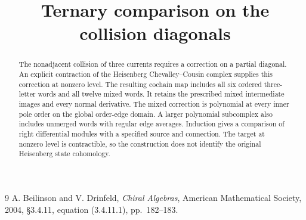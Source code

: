 \documentclass[11pt,oneside]{memoir}
\title{Ternary comparison on the collision diagonals}
\author{}
\date{}
\begin{document}
\maketitle
\begin{abstract}
The nonadjacent collision of three currents requires a correction on a partial diagonal.
An explicit contraction of the Heisenberg Chevalley--Cousin complex supplies this correction at nonzero level.
The resulting cochain map includes all six ordered three-letter words and all twelve mixed words.
It retains the prescribed mixed intermediate images and every normal derivative.
The mixed correction is polynomial at every inner pole order on the global order-edge domain.
A larger polynomial subcomplex also includes unmerged words with regular edge averages.
Induction gives a comparison of right differential modules with a specified source and connection.
The target at nonzero level is contractible, so the construction does not identify the original Heisenberg state cohomology.
\end{abstract}

\begin{thebibliography}{9}
A. Beilinson and V. Drinfeld,
\emph{Chiral Algebras}, American Mathematical Society, 2004,
\S3.4.11, equation (3.4.11.1), pp.~182--183.
\end{thebibliography}
\end{document}
